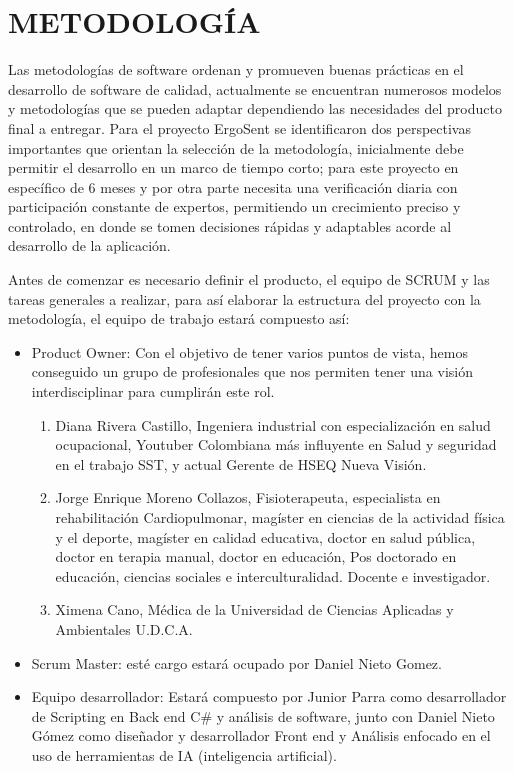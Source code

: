 \chapter{METODOLOGÍA}
Las metodologías de software ordenan y promueven buenas prácticas en el desarrollo de software de calidad, actualmente se encuentran numerosos modelos y metodologías que se pueden adaptar dependiendo las necesidades del producto final a entregar\parencite{Nohemy2015ESCOGERDECISION}. Para el proyecto ErgoSent se identificaron dos perspectivas importantes que orientan la selección de la metodología, inicialmente debe permitir el desarrollo en un marco de tiempo corto; para este proyecto en específico de 6 meses y por otra parte necesita una verificación diaria con participación constante de expertos, permitiendo un crecimiento preciso y controlado, en donde se tomen decisiones rápidas y adaptables acorde al desarrollo de la aplicación.


Antes de comenzar es necesario definir el producto, el equipo de SCRUM y las tareas generales a realizar, para así elaborar la estructura del proyecto con la metodología, el equipo de trabajo estará compuesto así: 
\begin{itemize}
    \item Product Owner:  Con el objetivo de tener varios puntos de vista, hemos conseguido un grupo de profesionales que nos permiten tener una visión interdisciplinar para cumplirán este rol.
    \begin{enumerate}
        \item Diana Rivera Castillo, Ingeniera industrial con especialización en salud ocupacional, Youtuber Colombiana más influyente en Salud y seguridad en el trabajo SST, y actual Gerente de HSEQ Nueva Visión.
        \item Jorge Enrique Moreno Collazos, Fisioterapeuta, especialista en rehabilitación Cardiopulmonar, magíster en ciencias de la actividad física y el deporte, magíster en calidad educativa, doctor en salud pública, doctor en terapia manual, doctor en educación, Pos doctorado en educación, ciencias sociales e interculturalidad. Docente e investigador.
        \item Ximena Cano, Médica de la Universidad de Ciencias Aplicadas y Ambientales U.D.C.A. 
    \end{enumerate}

\item Scrum Master: esté cargo estará ocupado por Daniel Nieto Gomez.
\item Equipo desarrollador: Estará compuesto por Junior Parra como desarrollador de Scripting en Back end C\# y análisis de software, junto con Daniel Nieto Gómez como diseñador y desarrollador Front end y Análisis enfocado en el uso de herramientas de IA (inteligencia artificial). 
\end{itemize}

